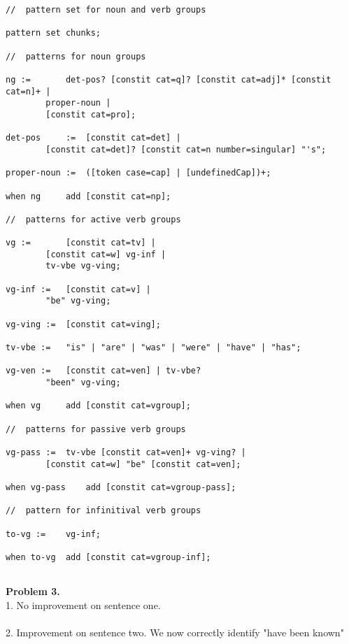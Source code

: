 \documentclass{article}
\begin{document}
\begin{verbatim}
//  pattern set for noun and verb groups

pattern set chunks;

//  patterns for noun groups

ng := 		det-pos? [constit cat=q]? [constit cat=adj]* [constit cat=n]+ |
		proper-noun |
		[constit cat=pro];

det-pos	    :=	[constit cat=det] |
		[constit cat=det]? [constit cat=n number=singular] "'s";

proper-noun :=	([token case=cap] | [undefinedCap])+;

when ng		add [constit cat=np];

//  patterns for active verb groups

vg :=		[constit cat=tv] |
		[constit cat=w] vg-inf |
		tv-vbe vg-ving;

vg-inf :=	[constit cat=v] |
		"be" vg-ving;

vg-ving :=	[constit cat=ving];

tv-vbe :=	"is" | "are" | "was" | "were" | "have" | "has";

vg-ven :=	[constit cat=ven] | tv-vbe?
		"been" vg-ving;

when vg		add [constit cat=vgroup];

//  patterns for passive verb groups

vg-pass :=	tv-vbe [constit cat=ven]+ vg-ving? |
		[constit cat=w] "be" [constit cat=ven];

when vg-pass	add [constit cat=vgroup-pass];

//  pattern for infinitival verb groups

to-vg :=	vg-inf;

when to-vg	add [constit cat=vgroup-inf];


\end{verbatim}
\newpage
\textbf{Problem 3. }
\\
1.  No improvement on sentence one.
\\
\\
2.  Improvement on sentence two.  We now correctly identify "have been known"
\end{document}
